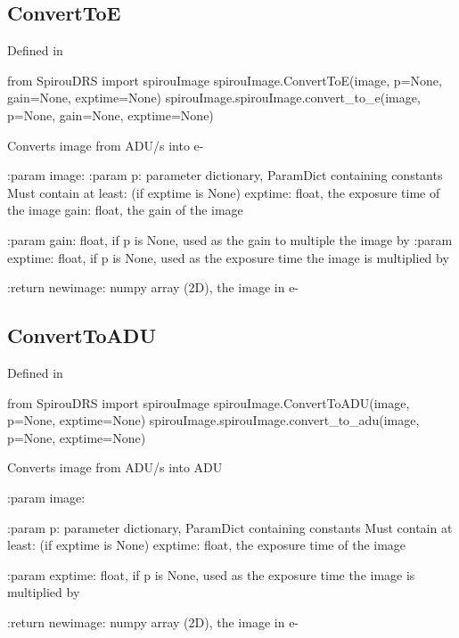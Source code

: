 \noindent\begin{minipage}{\textwidth}
\subsection{ConvertToE}

Defined in \spirouImage{}

\begin{pythonbox}
from SpirouDRS import spirouImage
spirouImage.ConvertToE(image, p=None, gain=None, exptime=None)
spirouImage.spirouImage.convert_to_e(image, p=None, gain=None, exptime=None)
\end{pythonbox}

\begin{pythondocstring}
Converts image from ADU/s into e-

:param image:
:param p: parameter dictionary, ParamDict containing constants
        Must contain at least: (if exptime is None)
            exptime: float, the exposure time of the image
            gain: float, the gain of the image

:param gain: float, if p is None, used as the gain to multiple the image by
:param exptime: float, if p is None, used as the exposure time the image
                is multiplied by

:return newimage: numpy array (2D), the image in e-
\end{pythondocstring}
\end{minipage}

\noindent\begin{minipage}{\textwidth}
\subsection{ConvertToADU}

Defined in \spirouImage{}

\begin{pythonbox}
from SpirouDRS import spirouImage
spirouImage.ConvertToADU(image, p=None, exptime=None)
spirouImage.spirouImage.convert_to_adu(image, p=None, exptime=None)
\end{pythonbox}

\begin{pythondocstring}
Converts image from ADU/s into ADU

:param image:

:param p: parameter dictionary, ParamDict containing constants
    Must contain at least: (if exptime is None)
        exptime: float, the exposure time of the image

:param exptime: float, if p is None, used as the exposure time the image
                is multiplied by

:return newimage: numpy array (2D), the image in e-
\end{pythondocstring}
\end{minipage}

